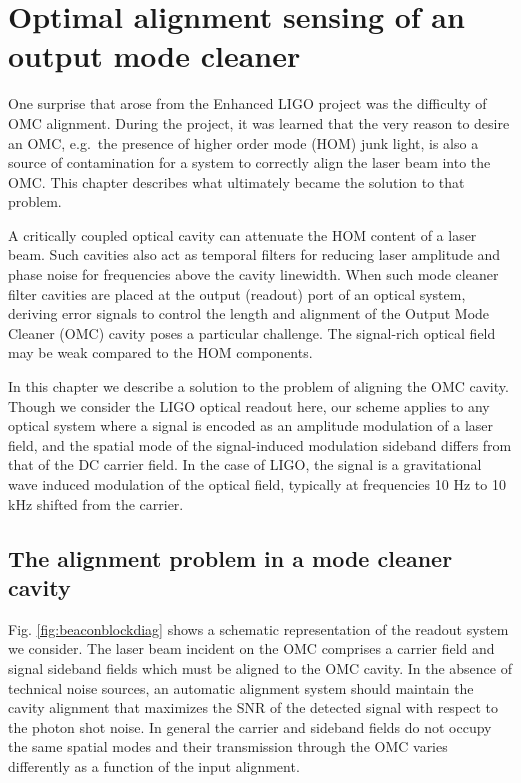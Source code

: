\chapter{Optimal alignment sensing of an output mode cleaner}
\label{ch:beacon}
One surprise that arose from the Enhanced LIGO project was the difficulty of OMC alignment. %
During the project, it was learned that the very reason to desire an OMC, e.g.\ the presence of higher order mode (HOM) junk light, is also a source of contamination for a system to correctly align the laser beam into the OMC. %
This chapter describes what ultimately became the solution to that problem.

A critically coupled optical cavity can attenuate the HOM content of a laser beam. %
Such cavities also act as temporal filters for reducing laser amplitude and phase noise for frequencies above the cavity linewidth. %
When such mode cleaner filter cavities are placed at the output (readout) port of an optical system, deriving error signals to control the length and alignment of the Output Mode Cleaner (OMC) cavity poses a particular challenge. %
The signal-rich optical field may be weak compared to the HOM components. %


In this chapter we describe a solution to the problem of aligning the OMC cavity. %
Though we consider the LIGO optical readout here, our scheme applies to any optical system where a signal is encoded as an amplitude modulation of a laser field, and the spatial mode of the signal-induced modulation sideband differs from that of the DC carrier field. %
 In the case of LIGO, the signal is a gravitational wave induced modulation of the optical field, typically at frequencies 10 Hz to 10 kHz shifted from the carrier. %


\section{The alignment problem in a mode cleaner cavity}
\label{sec:alignsnr}
Fig. %
\ref{fig:beaconblockdiag} shows a schematic representation of the readout system we consider. %
The laser beam incident on the OMC comprises a carrier field and signal sideband fields which must be aligned to the OMC cavity. %
In the absence of technical noise sources, an automatic alignment system should maintain the cavity alignment that maximizes the SNR of the detected signal with respect to the photon shot noise. %
In general the carrier and sideband fields do not occupy the same spatial modes and their transmission through the OMC varies differently as a function of the input alignment. %


